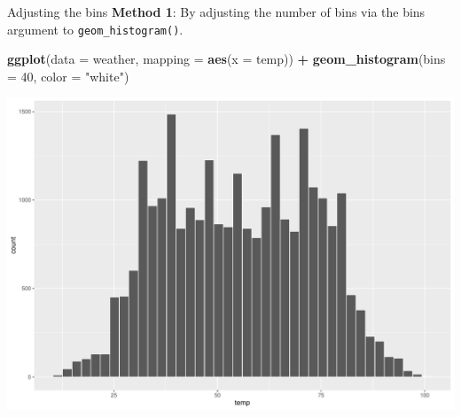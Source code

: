 \documentclass[
  ignorenonframetext,
]{beamer}
\newenvironment{Shaded}{\begin{snugshade}}{\end{snugshade}}
\newcommand{\AttributeTok}[1]{\textcolor[rgb]{0.13,0.29,0.53}{#1}}
\newcommand{\DecValTok}[1]{\textcolor[rgb]{0.00,0.00,0.81}{#1}}
\newcommand{\FunctionTok}[1]{\textcolor[rgb]{0.13,0.29,0.53}{\textbf{#1}}}
\newcommand{\NormalTok}[1]{#1}
\newcommand{\SpecialCharTok}[1]{\textcolor[rgb]{0.81,0.36,0.00}{\textbf{#1}}}
\newcommand{\StringTok}[1]{\textcolor[rgb]{0.31,0.60,0.02}{#1}}
\begin{document}
\begin{frame}[fragile]{Adjusting the bins}
\protect\hypertarget{adjusting-the-bins}{}
\textbf{Method 1}: By adjusting the number of bins via the bins argument
to \texttt{geom\_histogram()}.

\tiny

\begin{Shaded}
\begin{Highlighting}[]
\FunctionTok{ggplot}\NormalTok{(}\AttributeTok{data =}\NormalTok{ weather, }\AttributeTok{mapping =} \FunctionTok{aes}\NormalTok{(}\AttributeTok{x =}\NormalTok{ temp)) }\SpecialCharTok{+}
  \FunctionTok{geom\_histogram}\NormalTok{(}\AttributeTok{bins =} \DecValTok{40}\NormalTok{, }\AttributeTok{color =} \StringTok{"white"}\NormalTok{)}
\end{Highlighting}
\end{Shaded}

\begin{center}\includegraphics[width=0.7\linewidth,height=0.5\textheight]{Week2_Lect_files/figure-beamer/unnamed-chunk-29-1} \end{center}
\normalsize
\end{frame}
\end{document}

